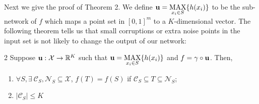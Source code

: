 Next we give the proof of Theorem 2.
We define $\mathbf u=\underset{x_i\in S}{\mbox{MAX}}\{h(x_i)\}$ to be the sub-network of $f$ which maps a point set in $[0,1]^m$ to a $K$-dimensional vector. The following theorem tells us that small corruptions or extra noise points in the input set is not likely to change the output of our network:
\begin{customthm}{2}
Suppose $\mathbf u:\mathcal{X}\rightarrow \mathbb{R}^K$ such that $\mathbf u=\underset{x_i\in S}{\mbox{MAX}}\{h(x_i)\}$ and $f=\gamma \circ \mathbf u$. Then, 
\begin{enumerate}[label=(\alph*)]   
    \item $\forall S, \exists~\mathcal{C}_S, \mathcal{N}_S\subseteq \mathcal{X}$,  $f(T)=f(S)$ if  $\mathcal{C}_S\subseteq T\subseteq \mathcal{N}_S$;
    \item $|\mathcal{C}_S| \le K$
\end{enumerate}
\end{customthm}

